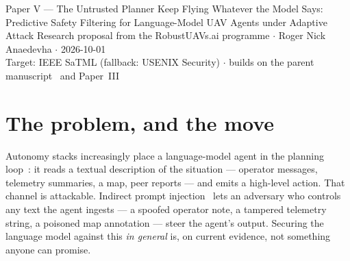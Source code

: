\documentclass[11pt,a4paper]{article}
\begin{document}
\proposalheader
  {Paper V --- The Untrusted Planner}
  {Keep Flying Whatever the Model Says: Predictive Safety Filtering for
   Language-Model UAV Agents under Adaptive Attack}
  {Research proposal from the RobustUAVs.ai programme $\cdot$
   Roger Nick Anaedevha $\cdot$ 2026-10-01\\
   Target: IEEE SaTML (fallback: USENIX Security) $\cdot$ builds on the parent
   manuscript~\cite{parentpaper} and Paper~III}

\begin{abstract}
\noindent
Language-model agents are beginning to sit in the high-level loop of autonomous
aircraft: translating an operator's instruction into waypoints, summarising
telemetry, choosing a task, proposing a mode change. That places an attackable,
hard-to-secure component upstream of a safety-critical controller, and the
natural question --- can we stop the language model from being fooled? --- has no
general answer. We propose to stop asking it. A \emph{predictive safety filter}
sits between the agent's proposed action and the actuators: it admits the action
only if the certified navigation model (the parent manuscript's) has a
recursively feasible trajectory keeping the aircraft inside its safe envelope
over the planning horizon, and otherwise overrides to a verified fallback. The
security claim is then independent of the language model's internals: for
\emph{any} sequence of agent outputs, adversarial or not, the physical state
stays in the certified safe set. An adaptive attacker who fully controls the
agent's inputs is thereby downgraded from causing a crash to causing a
\emph{stall} --- the filter converts a safety attack into a liveness attack, and
we quantify the residual it cannot prevent. We make three contributions: the
safety-invariance theorem for an untrusted planner; an adaptive-attack
evaluation protocol, following the discipline that a defence must be tested
against an adversary who knows the filter; and the measured trade between the
filter's conservatism and the mission-denial rate an attacker can force, run on
the RobustUAVs.ai simulator with real language-model agents in the loop.
\end{abstract}

\section{The problem, and the move}
Autonomy stacks increasingly place a language-model agent in the planning
loop~\cite{openai2024agents}: it reads a textual description of the situation ---
operator messages, telemetry summaries, a map, peer reports --- and emits a
high-level action. That channel is attackable. Indirect prompt
injection~\cite{greshake2023injection} lets an adversary who controls any text
the agent ingests --- a spoofed operator note, a tampered telemetry string, a
poisoned map annotation --- steer the agent's output. Securing the language
model against this \emph{in general} is, on current evidence, not something
anyone can promise.
\end{document}
